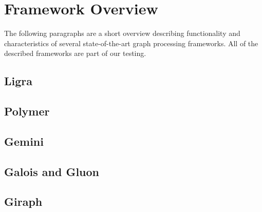 
\section{Framework Overview}
The following paragraphs are a short overview describing functionality and characteristics of several state-of-the-art graph processing frameworks.
All of the described frameworks are part of our testing.
\todo

\subsection{Ligra}


\subsection{Polymer}


\subsection{Gemini}


\subsection{Galois and Gluon}


\subsection{Giraph}





